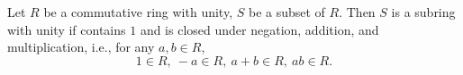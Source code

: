 \begin{proposition}
  Let $R$ be a commutative ring with unity, $S$ be a subset of $R$.
  Then $S$ is a subring with unity if contains $1$ and is closed under
  negation, addition, and multiplication, i.e.,
  for any $a, b \in R$,
  \begin{equation}
    1 \in R,\ -a \in R,\ a + b \in R,\ a b \in R.
  \end{equation}
\end{proposition}
